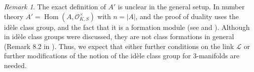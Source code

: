 \documentclass{amsart}
\theoremstyle{plain}
\theoremstyle{definition}
\theoremstyle{plain}
\theoremstyle{plain}
\theoremstyle{plain}
\theoremstyle{remark}
\newtheorem{remark}[theorem]{Remark}
\theoremstyle{remark}
\theoremstyle{plain}
\theoremstyle{definition}
\theoremstyle{plain}
\DeclareMathOperator{\Hom}{\mathrm{Hom}}
\theoremstyle{plain}
\theoremstyle{plain}
\numberwithin{equation}{section}
\begin{document}
\begin{remark}
The exact definition of $A'$ is unclear in the general setup. In number theory $A'=\Hom(A, \mathcal O_{K, S}^\times)$ with $n = |A|$, and the proof of duality uses the id\`ele class group, and the fact that it is a formation module (see \cite{poitou} and \cite{haberland1978galois}).
Although in \cite{uekiniibo} id\`ele class groups were discussed, they are not class formations in general (Remark 8.2 in \cite{uekiniibo}). Thus, we expect that either further conditions on the link $\mathcal{L}$ or further modifications of the notion of the id\`ele class group for 3-manifolds are needed.
\end{remark}


	

\vspace{0.4pc}           
\enlargethispage{3\baselineskip}

\makeatletter
\def\@setaddresses{%
  \par\nobreak\begingroup \scriptsize
  \def\author##1{\par\nobreak\addvspace{3pt}{\scshape##1}\par\nobreak}%
  \def\\{\unskip, \ignorespaces}%
  \interlinepenalty\@M
  \def\address##1##2{%
    \begingroup\par\nobreak\addvspace{2pt}{\scshape##1}\par\nobreak\indent
    \@ifnotempty{##1}{(\ignorespaces ##1\unskip )}%
      {\scshape\ignorespaces ##2}%
    \par\endgroup}%
  \def\curraddr##1##2{%
    \begingroup \@ifnotempty{##2}{%
      \nobreak\indent \curraddrname\@ifnotempty{##1}{, \ignorespaces ##1\unskip }\/:\space ##2\par}%
    \endgroup}%
  \def\email##1##2{%
    \begingroup\@ifnotempty{##2}{%
      \nobreak \indent \emailaddrname
      \@ifnotempty{##1}{, \ignorespaces ##1\unskip }\/:\space \ttfamily ##2\par}%
    \endgroup}%
  \def\urladdr##1##2{%
    \begingroup \def~{\char`\~}%
    \@ifnotempty{##2}{%
      \nobreak \indent \urladdrname
      \@ifnotempty{##1}{, \ignorespaces ##1\unskip }\/:\space \ttfamily ##2\par }%
    \endgroup }%
  \addresses\endgroup}
\makeatother



\end{document}

